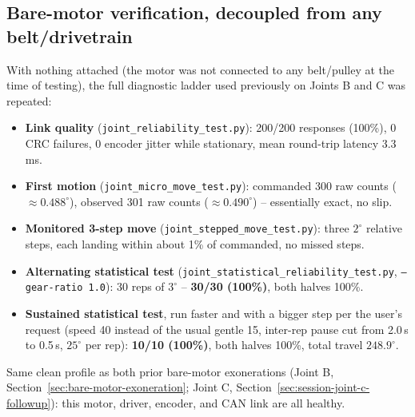 \documentclass[11pt,letterpaper]{article}
\begin{document}
\subsection{Bare-motor verification, decoupled from any belt/drivetrain}
With nothing attached (the motor was not connected to any belt/pulley at the time of testing), the full diagnostic ladder used previously on Joints B and C was repeated:
\begin{itemize}
    \item \textbf{Link quality} (\texttt{joint\_reliability\_test.py}): 200/200 responses (100\%), 0 CRC failures, 0 encoder jitter while stationary, mean round-trip latency 3.3\,ms.
    \item \textbf{First motion} (\texttt{joint\_micro\_move\_test.py}): commanded 300 raw counts ($\approx 0.488^\circ$), observed 301 raw counts ($\approx 0.490^\circ$) -- essentially exact, no slip.
    \item \textbf{Monitored 3-step move} (\texttt{joint\_stepped\_move\_test.py}): three $2^\circ$ relative steps, each landing within about 1\% of commanded, no missed steps.
    \item \textbf{Alternating statistical test} (\texttt{joint\_statistical\_reliability\_test.py}, \texttt{--gear-ratio 1.0}): 30 reps of $3^\circ$ -- \textbf{30/30 (100\%)}, both halves 100\%.
    \item \textbf{Sustained statistical test}, run faster and with a bigger step per the user's request (speed 40 instead of the usual gentle 15, inter-rep pause cut from 2.0\,s to 0.5\,s, $25^\circ$ per rep): \textbf{10/10 (100\%)}, both halves 100\%, total travel $248.9^\circ$.
\end{itemize}
Same clean profile as both prior bare-motor exonerations (Joint B, Section~\ref{sec:bare-motor-exoneration}; Joint C, Section~\ref{sec:session-joint-c-followup}): this motor, driver, encoder, and CAN link are all healthy.
\end{document}
